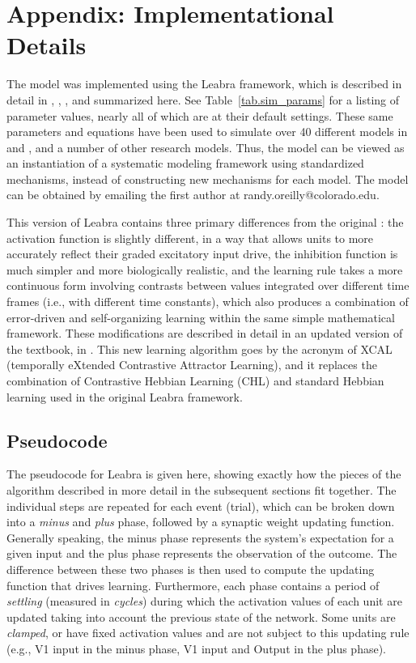 \section{Appendix: Implementational Details}

The model was implemented using the Leabra framework, which is described in detail in , , , and summarized here.  See Table~\ref{tab.sim_params} for a listing of parameter values, nearly all of which are at their default settings.  These same parameters and equations have been used to simulate over 40 different models in  and , and a number of other research models.  Thus, the model can be viewed as an instantiation of a systematic modeling framework using standardized mechanisms, instead of constructing new mechanisms for each model.  The model can be obtained by emailing the first author at randy.oreilly@colorado.edu.

This version of Leabra contains three primary differences from the original \cite{OReillyMunakata00}: the activation function is slightly different, in a way that allows units to more accurately reflect their graded excitatory input drive, the inhibition function is much simpler and more biologically realistic, and the learning rule takes a more continuous form involving contrasts between values integrated over different time frames (i.e., with different time constants), which also produces a combination of error-driven and self-organizing learning within the same simple mathematical framework.  These modifications are described in detail in an updated version of the  textbook, in .  This new learning algorithm goes by the acronym of XCAL (temporally eXtended Contrastive Attractor Learning), and it replaces the combination of Contrastive Hebbian Learning (CHL) and standard Hebbian learning used in the original Leabra framework.

\subsection{Pseudocode}

The pseudocode for Leabra is given here, showing exactly how the pieces of the algorithm described in more detail in the subsequent sections fit together. The individual steps are repeated for each event (trial), which can be broken down into a {\em minus} and {\em plus} phase, followed by a synaptic weight updating function. Generally speaking, the minus phase represents the system's expectation for a given input and the plus phase represents the observation of the outcome. The difference between these two phases is then used to compute the updating function that drives learning. Furthermore, each phase contains a period of {\em settling} (measured in {\em cycles}) during which the activation values of each unit are updated taking into account the previous state of the network. Some units are {\em clamped}, or have fixed activation values and are not subject to this updating rule (e.g., V1 input in the minus phase, V1 input and Output in the plus phase).


